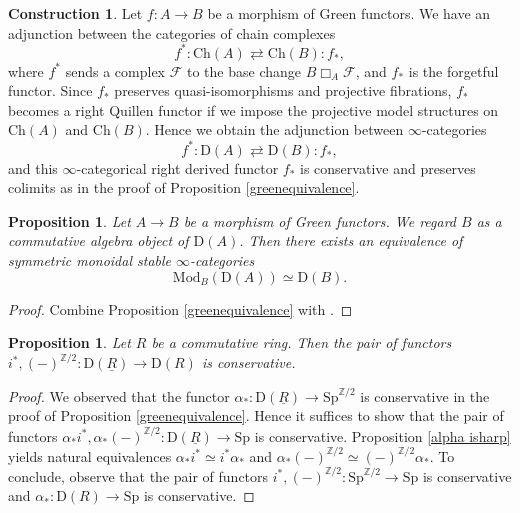 \documentclass[10pt]{amsart}
\newtheorem{prop}[thm]{Proposition}
\theoremstyle{definition}
\newtheorem{const}[thm]{Construction}
\numberwithin{equation}{section}
\newcommand{\Z}{\mathbb{Z}}
\newcommand{\cF}{\mathcal{F}}
\newcommand{\rD}{\mathrm{D}}
\newcommand{\ul}{\underline}
\newcommand{\Mod}{\mathrm{Mod}}
\newcommand{\Sp}{\mathrm{Sp}}
\newcommand{\Ch}{\mathrm{Ch}}
\begin{document}
\begin{const}
\label{const: derived functors of Green functors}
Let $f\colon A\to B$ be a morphism of Green functors.
We have an adjunction between the categories of chain complexes
\[
f^*
:
\Ch(A)
\rightleftarrows
\Ch(B)
:
f_*,
\]
where $f^*$ sends a complex $\cF$ to the base change $B\Box_{A} \cF$,
and $f_*$ is the forgetful functor.
Since $f_*$ preserves quasi-isomorphisms and projective fibrations,
$f_*$ becomes a right Quillen functor if we impose the projective model structures on $\Ch(A)$ and $\Ch(B)$.
Hence we obtain the adjunction between $\infty$-categories
\[
f^*
:
\rD(A)
\rightleftarrows
\rD(B)
:
f_*,
\]
and this $\infty$-categorical right derived functor $f_*$ is conservative and preserves colimits as in the proof of Proposition \ref{greenequivalence}.
\end{const}


\begin{prop}
\label{abelian Dold-Kan}
Let $A\to B$ be a morphism of Green functors.
We regard $B$ as a commutative algebra object of $\rD(A)$.
Then there exists an equivalence of symmetric monoidal stable $\infty$-categories
\[
\Mod_{B}(\rD(A))
\simeq
\rD(B).
\]
\end{prop}
\begin{proof}
Combine Proposition \ref{greenequivalence} with \cite[Corollary 3.4.1.9]{HA}.
\end{proof}

\begin{prop}
\label{conservativity}
Let $R$ be a commutative ring.
Then the pair of functors $i^*,(-)^{\Z/2}\colon \rD(\ul{R})\to \rD(R)$ is conservative.
\end{prop}
\begin{proof}
We observed that the functor $\alpha_*\colon \rD(\ul{R})\to \Sp^{\Z/2}$ is conservative
in the proof of Proposition \ref{greenequivalence}.
Hence it suffices to show that the pair of functors $\alpha_*i^*,\alpha_*(-)^{\Z/2}\colon \rD(\ul{R})\to\Sp$ is conservative.
Proposition \ref{alpha isharp} yields natural equivalences $\alpha_*i^*\simeq i^*\alpha_*$ and $\alpha_*(-)^{\Z/2}\simeq (-)^{\Z/2}\alpha_*$.
To conclude,
observe that the pair of functors $i^*,(-)^{\Z/2}\colon \Sp^{\Z/2}\to \Sp$ is conservative and $\alpha_*\colon \rD(R)\to \Sp$ is conservative.
\end{proof}
\end{document}
